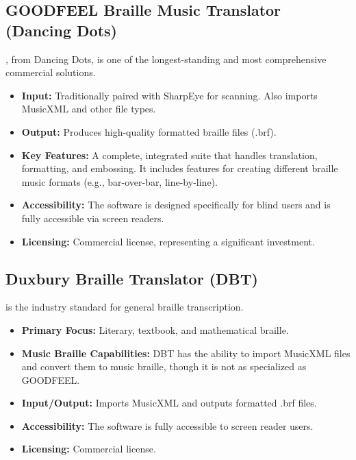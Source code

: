 \subsection{GOODFEEL Braille Music Translator (Dancing Dots)}\label{ch10:ssec:goodfeel}
, from Dancing Dots, is one of the longest-standing and most comprehensive commercial solutions.
\begin{itemize}
	\item \textbf{Input:} Traditionally paired with SharpEye for scanning. Also imports \gls{MusicXML} and other file types.
	\item \textbf{Output:} Produces high-quality formatted braille files (.brf).
	\item \textbf{Key Features:} A complete, integrated suite that handles translation, formatting, and embossing. It includes features for creating different braille music formats (e.g., bar-over-bar, line-by-line).
	\item \textbf{Accessibility:} The software is designed specifically for blind users and is fully accessible via screen readers.
	\item \textbf{Licensing:} Commercial license, representing a significant investment.
\end{itemize}

\subsection{Duxbury Braille Translator (DBT)}\label{ch10:ssec:dbt}
 is the industry standard for general braille transcription.
\begin{itemize}
	\item \textbf{Primary Focus:} Literary, textbook, and mathematical braille.
	\item \textbf{Music Braille Capabilities:} DBT has the ability to import \gls{MusicXML} files and convert them to music braille, though it is not as specialized as GOODFEEL.
	\item \textbf{Input/Output:} Imports \gls{MusicXML} and outputs formatted .brf files.
	\item \textbf{Accessibility:} The software is fully accessible to screen reader users.
	\item \textbf{Licensing:} Commercial license.
\end{itemize}

